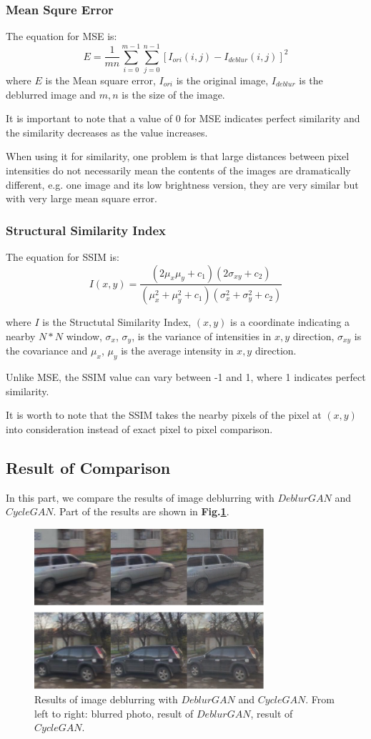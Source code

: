 \documentclass[journal]{IEEEtran}
\begin{document}
\subsubsection{Mean Squre Error}
The equation for MSE is:
$$E = \frac{1}{mn} \sum_{i=0}^{m-1}\sum_{j=0}^{n-1}[I_{ori}(i,j) - I_{deblur}(i,j)]^2$$
where $E$ is the Mean square error, $I_{ori}$ is the original image, $I_{deblur}$ is the deblurred image and $m,n$ is the size of the image.  

It is important to note that a value of 0 for MSE indicates perfect similarity and the similarity decreases as the value increases.

When using it for similarity, one problem is that large distances between pixel intensities do not necessarily mean the contents of the images are dramatically different, e.g. one image and its low brightness version, they are very similar but with very large mean square error.
\subsubsection{Structural Similarity Index}
The equation for SSIM is:
$$ I(x,y) = \frac{(2\mu_x\mu_y +c_1)(2\sigma_{xy}+c_2)}{(\mu_x^2+\mu_y^2+c_1)(\sigma_x^2+\sigma_y^2+c_2)}$$

where $I$ is the Structutal Similarity Index, $(x,y)$ is a coordinate indicating a nearby $N*N$ window, $\sigma_x$, $\sigma_y$, is the variance of intensities in $x,y$ direction,  $\sigma_{xy}$ is the covariance and $\mu_x$, $\mu_y$ is the average intensity in $x,y$ direction.

Unlike MSE, the SSIM value can vary between -1 and 1, where 1 indicates perfect similarity.

It is worth to note that the SSIM takes the nearby pixels of the pixel at $(x,y)$ into consideration instead of exact pixel to pixel comparison.

\subsection{Result of Comparison}
In this part, we compare the results of image deblurring with $DeblurGAN$ and $CycleGAN$. Part of the results are shown in \textbf{Fig.\ref{fig:compare}}. 

\begin{figure}[htbp]
	\centering
	\includegraphics[width=8.5cm]{fig/compare.png}
	\caption{Results of image deblurring with $DeblurGAN$ and $CycleGAN$. From left to right: blurred photo, result of $DeblurGAN$, result of $CycleGAN$.}
	\label{fig:compare}
\end{figure}
\end{document}
